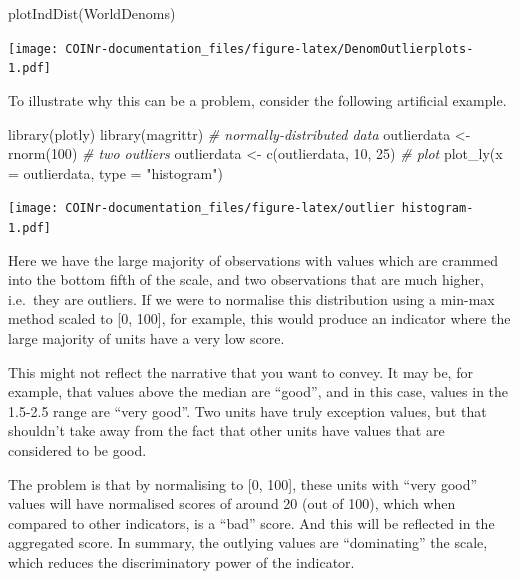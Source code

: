 \documentclass[
]{book}
\newenvironment{Shaded}{\begin{snugshade}}{\end{snugshade}}
\newcommand{\AttributeTok}[1]{\textcolor[rgb]{0.77,0.63,0.00}{#1}}
\newcommand{\CommentTok}[1]{\textcolor[rgb]{0.56,0.35,0.01}{\textit{#1}}}
\newcommand{\DecValTok}[1]{\textcolor[rgb]{0.00,0.00,0.81}{#1}}
\newcommand{\FunctionTok}[1]{\textcolor[rgb]{0.00,0.00,0.00}{#1}}
\newcommand{\NormalTok}[1]{#1}
\newcommand{\OtherTok}[1]{\textcolor[rgb]{0.56,0.35,0.01}{#1}}
\newcommand{\StringTok}[1]{\textcolor[rgb]{0.31,0.60,0.02}{#1}}
\begin{document}
\begin{Shaded}
\begin{Highlighting}[]
\FunctionTok{plotIndDist}\NormalTok{(WorldDenoms)}
\end{Highlighting}
\end{Shaded}

\texttt{[image: COINr-documentation\_files/figure-latex/DenomOutlierplots-1.pdf]}

To illustrate why this can be a problem, consider the following artificial example.

\begin{Shaded}
\begin{Highlighting}[]
\FunctionTok{library}\NormalTok{(plotly)}
\FunctionTok{library}\NormalTok{(magrittr)}
\CommentTok{\# normally{-}distributed data}
\NormalTok{outlierdata }\OtherTok{\textless{}{-}} \FunctionTok{rnorm}\NormalTok{(}\DecValTok{100}\NormalTok{)}
\CommentTok{\# two outliers}
\NormalTok{outlierdata }\OtherTok{\textless{}{-}} \FunctionTok{c}\NormalTok{(outlierdata, }\DecValTok{10}\NormalTok{, }\DecValTok{25}\NormalTok{)}
\CommentTok{\# plot}
\FunctionTok{plot\_ly}\NormalTok{(}\AttributeTok{x =}\NormalTok{ outlierdata, }\AttributeTok{type =} \StringTok{"histogram"}\NormalTok{)}
\end{Highlighting}
\end{Shaded}

\texttt{[image: COINr-documentation\_files/figure-latex/outlier histogram-1.pdf]}

Here we have the large majority of observations with values which are crammed into the bottom fifth of the scale, and two observations that are much higher, i.e.~they are outliers. If we were to normalise this distribution using a min-max method scaled to {[}0, 100{]}, for example, this would produce an indicator where the large majority of units have a very low score.

This might not reflect the narrative that you want to convey. It may be, for example, that values above the median are ``good'', and in this case, values in the 1.5-2.5 range are ``very good''. Two units have truly exception values, but that shouldn't take away from the fact that other units have values that are considered to be good.

The problem is that by normalising to {[}0, 100{]}, these units with ``very good'' values will have normalised scores of around 20 (out of 100), which when compared to other indicators, is a ``bad'' score. And this will be reflected in the aggregated score. In summary, the outlying values are ``dominating'' the scale, which reduces the discriminatory power of the indicator.
\end{document}
